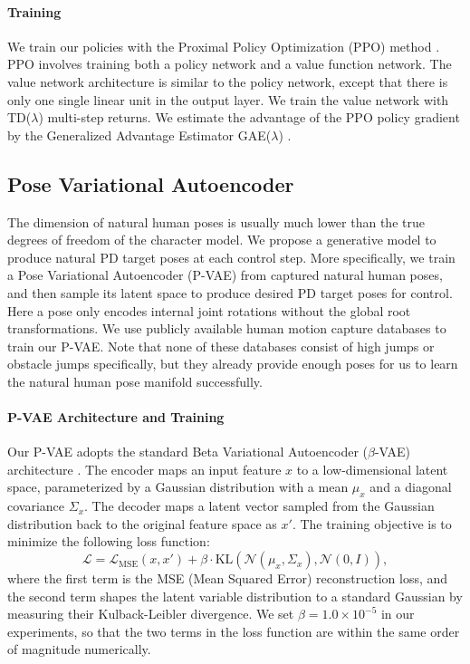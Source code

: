 \paragraph{Training}
We train our policies with the Proximal Policy Optimization (PPO) method \cite{Schulman:2017:PPO}. PPO involves training both a policy network and a value function network. The value network architecture is similar to the policy network, except that there is only one single linear unit in the output layer. We train the value network with TD($\lambda$) multi-step returns. We estimate the advantage of the PPO policy gradient by the Generalized Advantage Estimator GAE($\lambda$) \cite{Generalized-Advantage-Estimation}.

\subsection{Pose Variational Autoencoder}\label{sec:methods-PVAE}
The dimension of natural human poses is usually much lower than the true degrees of freedom of the character model. We propose a generative model to produce natural PD target poses at each control step. More specifically, we train a Pose Variational Autoencoder (P-VAE) from captured natural human poses, and then sample its latent space to produce desired PD target poses for control. Here a pose only encodes internal joint rotations without the global root transformations. We use publicly available human motion capture databases to train our P-VAE. Note that none of these databases consist of high jumps or obstacle jumps specifically, but they already provide enough poses for us to learn the natural human pose manifold successfully.

\paragraph{P-VAE Architecture and Training}
Our P-VAE adopts the standard Beta Variational Autoencoder ($\beta$-VAE) architecture \cite{beta-VAE}. The encoder maps an input feature $x$ to a low-dimensional latent space, parameterized by a Gaussian distribution with a mean $\mu_x$ and a diagonal covariance $\Sigma_x$. The decoder maps a latent vector sampled from the Gaussian distribution back to the original feature space as $x'$. The training objective is to minimize the following loss function:
\begin{equation}
    \mathcal{L} = \mathcal{L}_\text{MSE}(x,x') + \beta \cdot \text{KL}(\mathcal{N}(\mu_x, \Sigma_x), \mathcal{N}(0, I)),
\end{equation}
where the first term is the MSE (Mean Squared Error) reconstruction loss, and the second term shapes the latent variable distribution to a standard Gaussian by measuring their Kulback-Leibler divergence. We set $\beta = 1.0\times10^{-5}$ in our experiments, so that the two terms in the loss function are within the same order of magnitude numerically.

